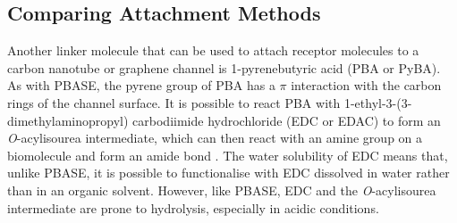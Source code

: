 \documentclass[
  a4paper,
]{scrbook}
\begin{document}
\hypertarget{comparing-attachment-methods}{%
\subsection{Comparing Attachment
Methods}\label{comparing-attachment-methods}}

Another linker molecule that can be used to attach receptor molecules to
a carbon nanotube or graphene channel is 1-pyrenebutyric acid (PBA or
PyBA). As with PBASE, the pyrene group of PBA has a \(\pi\) interaction
with the carbon rings of the channel surface. It is possible to react
PBA with 1-ethyl-3-(3-dimethylaminopropyl) carbodiimide hydrochloride
(EDC or EDAC) to form an \emph{O}-acylisourea intermediate, which can
then react with an amine group on a biomolecule and form an amide bond
\autocite{Sehgal1994,Hermanson2013-4}. The water solubility of EDC means
that, unlike PBASE, it is possible to functionalise with EDC dissolved
in water rather than in an organic solvent. However, like PBASE, EDC and
the \emph{O}-acylisourea intermediate are prone to hydrolysis,
especially in acidic conditions.

\newpage
\thispagestyle{empty}

\hfill\break
\hfill\break
\end{document}

